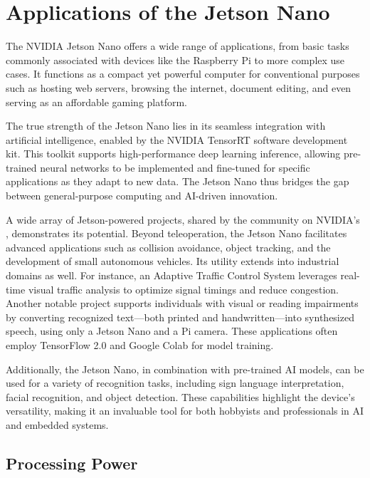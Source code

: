 \newpage


\section{Applications of the Jetson Nano}

The NVIDIA Jetson Nano offers a wide range of applications, from basic tasks commonly associated with devices like the Raspberry Pi to more complex use cases. It functions as a compact yet powerful computer for conventional purposes such as hosting web servers, browsing the internet, document editing, and even serving as an affordable gaming platform. \cite{Kurniawan:2021}

The true strength of the Jetson Nano lies in its seamless integration with artificial intelligence, enabled by the NVIDIA TensorRT software development kit. This toolkit supports high-performance deep learning inference, allowing pre-trained neural networks to be implemented and fine-tuned for specific applications as they adapt to new data. The Jetson Nano thus bridges the gap between general-purpose computing and AI-driven innovation.

A wide array of Jetson-powered projects, shared by the community on NVIDIA’s   \cite{JetsonProjects:2020} , demonstrates its potential. Beyond teleoperation, the Jetson Nano facilitates advanced applications such as collision avoidance, object tracking, and the development of small autonomous vehicles. Its utility extends into industrial domains as well. For instance, an Adaptive Traffic Control System leverages real-time visual traffic analysis to optimize signal timings and reduce congestion. Another notable project supports individuals with visual or reading impairments by converting recognized text—both printed and handwritten—into synthesized speech, using only a Jetson Nano and a Pi camera. These applications often employ TensorFlow 2.0 and Google Colab for model training.

Additionally, the Jetson Nano, in combination with pre-trained AI models, can be used for a variety of recognition tasks, including sign language interpretation, facial recognition, and object detection. These capabilities highlight the device’s versatility, making it an invaluable tool for both hobbyists and professionals in AI and embedded systems.

\subsection{Processing Power}


